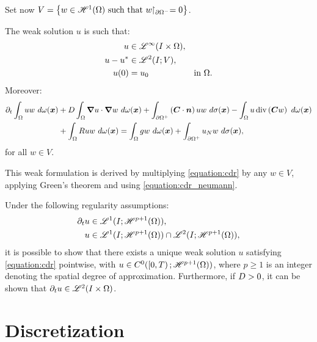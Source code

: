 Set now $V = \left\{ w \in \mathscr{H}^{1}(\Omega) \text{ such that } w \!\!\restriction_{\partial \Omega^-} = 0 \right\}$.

\begin{definition}
    The weak solution $u$ is such that: 
    \begin{align}
        u &\in \mathscr{L}^{\infty}(I \times \Omega), \\
        u - u^* &\in \mathscr{L}^{2}(I; V), \\
        u(0) &= u_0 &\text{in } \Omega.
    \end{align}
    Moreover:
    \begin{align}
        \partial_t \int_{\Omega} u w ~ d \omega(\bm{x}) &+ D \int_{\Omega} \bm{\nabla} u \cdot \bm{\nabla} w ~ d \omega(\bm{x}) + \int_{\partial \Omega^+} \left( \bm{C} \cdot \bm{n} \right) u w ~ d \sigma(\bm{x}) - \int_{\Omega} u \operatorname*{div} \left( \bm{C} w \right) ~ d \omega(\bm{x}) \notag \\
        &+ \int_{\Omega} R u w ~ d \omega(\bm{x}) = \int_{\Omega} g w ~ d \omega(\bm{x}) + \int_{\partial \Omega^+} u_N w ~ d \sigma(\bm{x}),
    \end{align}
    for all $w \in V$.
\end{definition}
This weak formulation is derived by multiplying \cref{equation:cdr} by any $w \in V$, applying Green's theorem and using \cref{equation:cdr_neumann}. %

Under the following regularity assumptions:
\begin{align}
    \partial_t u & \in \mathscr{L}^{1}(I; \mathscr{H}^{p + 1}(\Omega)), \label{equation:assumption_regularity_1} \\
    u & \in \mathscr{L}^{1}(I; \mathscr{H}^{p + 1}(\Omega)) \cap \mathscr{L}^{2}(I; \mathscr{H}^{p + 1}(\Omega)), \label{equation:assumption_regularity_2}
\end{align}
it is possible to show that there exists a unique weak solution $u$ satisfying \cref{equation:cdr} pointwise, with $u \in C^0(\left[ 0, T \right); \mathscr{H}^{p + 1}(\Omega))$, where $p \geq 1$ is an integer denoting the spatial degree of approximation. Furthermore, if $D > 0$, it can be shown that $\partial_t u \in \mathscr{L}^{2}(I \times \Omega)$.

\newpage
\section{Discretization} \label{sec:cdr_discretization}


